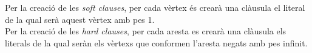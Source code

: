 \documentclass[../informe.tex]{subfiles}
\begin{document}
Per la creació de les \textit{soft clauses}, per cada vèrtex és crearà una clàusula el literal de la qual serà aquest vèrtex amb pes 1. \\

Per la creació de les \textit{hard clauses}, per cada aresta es crearà una clàusula els literals de la qual seràn els vèrtexs que conformen l'aresta negats amb pes infinit.
\end{document}
